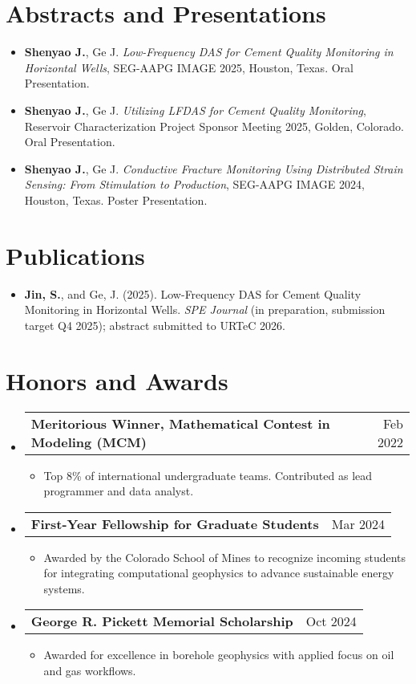 \documentclass[letterpaper,13pt]{article}
\makeatletter
\newcommand{\resumeItem}[1]{\item\small{{#1 \vspace{-2pt}}}}
\newcommand{\resumeProjectHeading}[2]{
    \item
    \begin{tabular*}{0.97\textwidth}{l@{\extracolsep{\fill}}r}
      \small#1 & #2 \\
    \end{tabular*}\vspace{-7pt}
}
\newcommand{\resumeItemListStart}{\begin{itemize}[label={\small$\bullet$}]}
\newcommand{\resumeItemListEnd}{\end{itemize}\vspace{-5pt}}
\newcommand{\resumeSubHeadingListStart}{\begin{itemize}[leftmargin=0.15in, label={}]}
\newcommand{\resumeSubHeadingListEnd}{\end{itemize}}
\makeatother
\begin{document}
\section{Abstracts and Presentations}
\resumeSubHeadingListStart
  \resumeItem{\textbf{Shenyao J.}, Ge J. \textit{Low-Frequency DAS for Cement Quality Monitoring in Horizontal Wells}, SEG-AAPG IMAGE 2025, Houston, Texas. Oral Presentation.}
  \resumeItem{\textbf{Shenyao J.}, Ge J. \textit{Utilizing LFDAS for Cement Quality Monitoring}, Reservoir Characterization Project Sponsor Meeting 2025, Golden, Colorado. Oral Presentation.}
  \resumeItem{\textbf{Shenyao J.}, Ge J. \textit{Conductive Fracture Monitoring Using Distributed Strain Sensing: From Stimulation to Production}, SEG-AAPG IMAGE 2024, Houston, Texas. Poster Presentation.}
\resumeSubHeadingListEnd



\section{Publications}
\resumeSubHeadingListStart
  \resumeItem{\textbf{Jin, S.}, and Ge, J. (2025). Low-Frequency DAS for Cement Quality Monitoring in Horizontal Wells. \textit{SPE Journal} (in preparation, submission target Q4 2025); abstract submitted to URTeC 2026.}
\resumeSubHeadingListEnd


\section{Honors and Awards}
\resumeSubHeadingListStart

\resumeProjectHeading
  {\textbf{Meritorious Winner, Mathematical Contest in Modeling (MCM)}}{Feb 2022}
\resumeItemListStart
  \resumeItem{Top 8\% of international undergraduate teams. Contributed as lead programmer and data analyst.}
\resumeItemListEnd

\resumeProjectHeading
  {\textbf{First-Year Fellowship for Graduate Students}}{Mar 2024}
\resumeItemListStart
  \resumeItem{Awarded by the Colorado School of Mines to recognize incoming students for integrating computational geophysics to advance sustainable energy systems.}
\resumeItemListEnd

\resumeProjectHeading
  {\textbf{George R. Pickett Memorial Scholarship}}{Oct 2024}
\resumeItemListStart
  \resumeItem{Awarded for excellence in borehole geophysics with applied focus on oil and gas workflows.}
\resumeItemListEnd

\resumeSubHeadingListEnd
\end{document}
